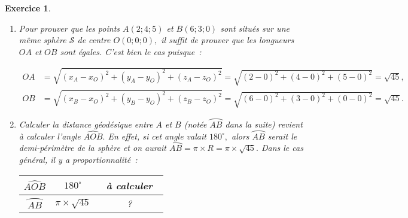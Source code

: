 \documentclass[10pt]{article}
\newtheorem{exo}{Exercice}
\begin{document}
\newpage


\begin{exo}

\begin{enumerate}
\item Pour prouver que les points $A(2;4;5)$ et $B(6;3;0)$ sont situés sur une même sphère $\mathcal{S}$ de centre $O(0;0;0),$ il suffit de prouver que les longueurs $OA$ et $OB$ sont égales. C'est bien le cas puisque~:

\begin{align*}
 OA&=\sqrt{\left(x_A-x_O\right)^2+\left(y_A-y_O\right)^2+\left(z_A-z_O\right)^2}=\sqrt{(2-0)^2+(4-0)^2+(5-0)^2}=\sqrt{45},\\
  OB&=\sqrt{\left(x_B-x_O\right)^2+\left(y_B-y_O\right)^2+\left(z_B-z_O\right)^2}=\sqrt{(6-0)^2+(3-0)^2+(0-0)^2}=\sqrt{45}.
  \end{align*}

\item

\setlength{\columnseprule}{1pt}

\begin{multicols}{2}

Calculer la distance géodésique entre $A$ et $B$ (notée $\wideparen{AB}$ dans la suite) revient à calculer l'angle $\widehat{AOB}.$ En effet, si cet angle valait $180^{\circ},$ alors $\wideparen{AB}$ serait le demi-périmètre de la sphère et on aurait $\wideparen{AB}=\pi\times R=\pi\times \sqrt{45}.$ Dans le cas général, il y a proportionnalité~:

\medskip

\begin{center}

\begin{tabular}{|c|c|c|}\hline
$\widehat{AOB}$&$180^{\circ}$&~à calculer~\\ \hline
$\wideparen{AB}$&$\pi\times \sqrt{45}$&~?~\\ \hline
\end{tabular}

\end{center}



\end{multicols}
\end{enumerate}
\end{exo}
\end{document}
